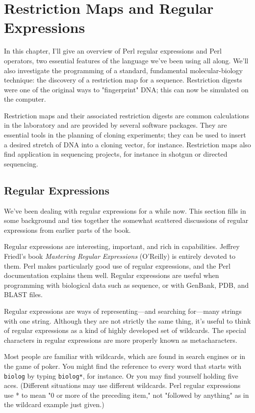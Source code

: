 \chapter{Restriction Maps and Regular Expressions}
\label{chap:chapter9}
\minitoc

In this chapter, I'll give an overview of Perl regular expressions and Perl operators, two essential features of the language we've been using all along. We'll also investigate the programming of a standard, fundamental molecular-biology technique: the discovery of a restriction map for a sequence. Restriction digests were one of the original ways to "fingerprint" DNA; this can now be simulated on the computer.

Restriction maps and their associated restriction digests are common calculations in the laboratory and are provided by several software packages. They are essential tools in the planning of cloning experiments; they can be used to insert a desired stretch of DNA into a cloning vector, for instance. Restriction maps also find application in sequencing projects, for instance in shotgun or directed sequencing.

\section{Regular Expressions}
We've been dealing with regular expressions for a while now. This section fills in some background and ties together the somewhat scattered discussions of regular expressions from earlier parts of the book.

Regular expressions are interesting, important, and rich in capabilities. Jeffrey Friedl's book \textit{Mastering Regular Expressions} (O'Reilly) is entirely devoted to them. Perl makes particularly good use of regular expressions, and the Perl documentation explains them well. Regular expressions are useful when programming with biological data such as sequence, or with GenBank, PDB, and BLAST files.

Regular expressions are ways of representing—and searching for—many strings with one string. Although they are not strictly the same thing, it's useful to think of regular expressions as a kind of highly developed set of wildcards. The special characters in regular expressions are more properly known as metacharacters.

Most people are familiar with wildcards, which are found in search engines or in the game of poker. You might find the reference to every word that starts with \verb|biolog| by typing \verb|biolog*|, for instance. Or you may find yourself holding five aces. (Different situations may use different wildcards. Perl regular expressions use * to mean "0 or more of the preceding item," not "followed by anything" as in the wildcard example just given.)

